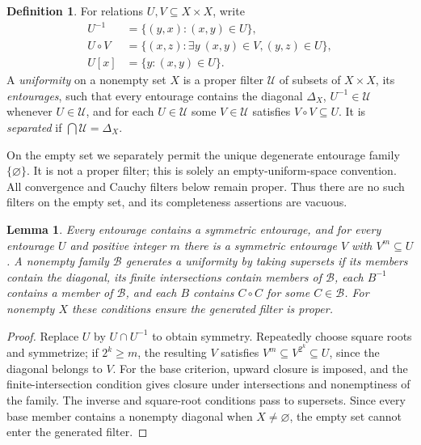 \documentclass[11pt,oneside,openany]{book}
\newtheorem{lemma}[theorem]{Lemma}
\theoremstyle{definition}
\newtheorem{definition}[theorem]{Definition}
\theoremstyle{remark}
\begin{document}
\begin{definition}\label{d10:12:uniformity}
For relations $U,V\subseteq X\times X$, write
\begin{align*}
 U^{-1}&=\{(y,x):(x,y)\in U\},\\
 U\circ V&=\{(x,z):\exists y\ (x,y)\in V,(y,z)\in U\},\\
 U[x]&=\{y:(x,y)\in U\}.
\end{align*}
A \emph{uniformity} on a nonempty set $X$ is a proper filter $\mathcal U$ of subsets of $X\times X$, its \emph{entourages}, such that every entourage contains the diagonal $\Delta_X$, $U^{-1}\in\mathcal U$ whenever $U\in\mathcal U$, and for each $U\in\mathcal U$ some $V\in\mathcal U$ satisfies $V\circ V\subseteq U$. It is \emph{separated} if $\bigcap\mathcal U=\Delta_X$.

On the empty set we separately permit the unique degenerate entourage family $\{\varnothing\}$. It is not a proper filter; this is solely an empty-uniform-space convention. All convergence and Cauchy filters below remain proper. Thus there are no such filters on the empty set, and its completeness assertions are vacuous.
\end{definition}

\begin{lemma}\label{d10:12:entourage-calculus}
Every entourage contains a symmetric entourage, and for every entourage $U$ and positive integer $m$ there is a symmetric entourage $V$ with $V^m\subseteq U$. A nonempty family $\mathcal B$ generates a uniformity by taking supersets if its members contain the diagonal, its finite intersections contain members of $\mathcal B$, each $B^{-1}$ contains a member of $\mathcal B$, and each $B$ contains $C\circ C$ for some $C\in\mathcal B$. For nonempty $X$ these conditions ensure the generated filter is proper.
\end{lemma}
\begin{proof}
Replace $U$ by $U\cap U^{-1}$ to obtain symmetry. Repeatedly choose square roots and symmetrize; if $2^k\geq m$, the resulting $V$ satisfies $V^m\subseteq V^{2^k}\subseteq U$, since the diagonal belongs to $V$. For the base criterion, upward closure is imposed, and the finite-intersection condition gives closure under intersections and nonemptiness of the family. The inverse and square-root conditions pass to supersets. Since every base member contains a nonempty diagonal when $X\ne\varnothing$, the empty set cannot enter the generated filter.
\end{proof}
\end{document}
